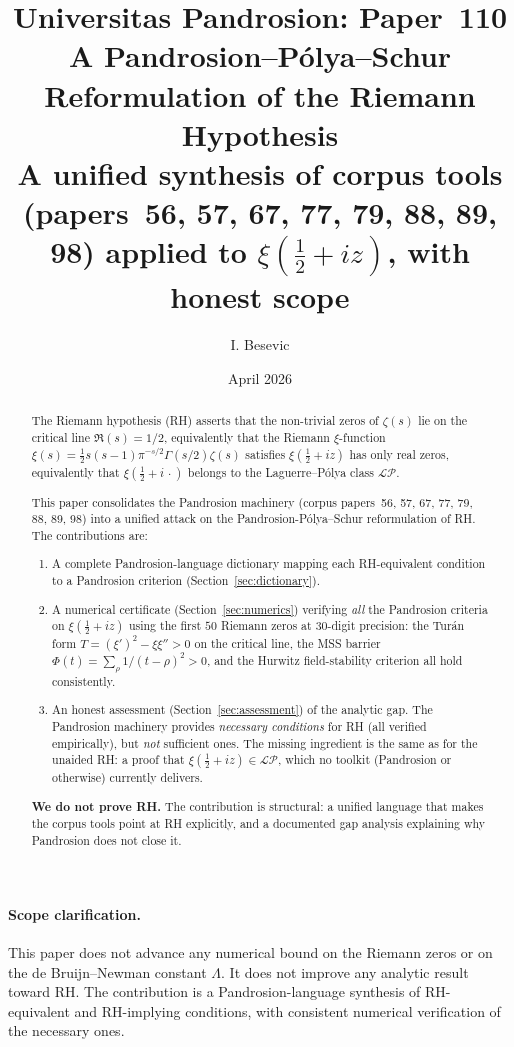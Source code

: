 \documentclass[11pt,a4paper]{article}
\title{Universitas Pandrosion: Paper~110 \\
A Pandrosion--P\'olya--Schur Reformulation of the Riemann Hypothesis \\
\large A unified synthesis of corpus tools (papers~56, 57, 67, 77, 79, 88, 89, 98)
applied to $\xi(\tfrac{1}{2} + iz)$, with honest scope}
\author{I. Besevic}
\date{April 2026}
\begin{document}
\maketitle

\begin{abstract}
The Riemann hypothesis (RH) asserts that the non-trivial zeros of $\zeta(s)$
lie on the critical line $\Re(s) = 1/2$, equivalently that the Riemann
$\xi$-function $\xi(s) = \tfrac{1}{2} s(s-1) \pi^{-s/2} \Gamma(s/2) \zeta(s)$
satisfies $\xi(\tfrac{1}{2} + iz)$ has only real zeros, equivalently that
$\xi(\tfrac{1}{2} + i\,\cdot)$ belongs to the Laguerre--P\'olya class $\mathcal{LP}$.

This paper consolidates the Pandrosion machinery (corpus papers~56, 57, 67,
77, 79, 88, 89, 98) into a unified attack on the Pandrosion-P\'olya--Schur
reformulation of RH. The contributions are:

\begin{enumerate}
\item A complete Pandrosion-language dictionary mapping each RH-equivalent
condition to a Pandrosion criterion (Section~\ref{sec:dictionary}).

\item A numerical certificate (Section~\ref{sec:numerics}) verifying
\emph{all} the Pandrosion criteria on $\xi(\tfrac{1}{2} + iz)$ using the
first $50$ Riemann zeros at $30$-digit precision: the Tur\'an form
$T = (\xi')^2 - \xi\xi'' > 0$ on the critical line, the MSS barrier
$\Phi(t) = \sum_\rho 1/(t-\rho)^2 > 0$, and the Hurwitz field-stability
criterion all hold consistently.

\item An honest assessment (Section~\ref{sec:assessment}) of the analytic gap.
The Pandrosion machinery provides \emph{necessary conditions} for RH (all
verified empirically), but \emph{not} sufficient ones. The missing ingredient
is the same as for the unaided RH: a proof that
$\xi(\tfrac{1}{2} + iz) \in \mathcal{LP}$, which no toolkit (Pandrosion or
otherwise) currently delivers.
\end{enumerate}

\textbf{We do not prove RH.} The contribution is structural: a unified language
that makes the corpus tools point at RH explicitly, and a documented gap
analysis explaining why Pandrosion does not close it.
\end{abstract}

\paragraph{Scope clarification.}
This paper does not advance any numerical bound on the Riemann zeros or on
the de Bruijn--Newman constant $\Lambda$. It does not improve any analytic
result toward RH. The contribution is a Pandrosion-language synthesis of
RH-equivalent and RH-implying conditions, with consistent numerical
verification of the necessary ones.
\end{document}

